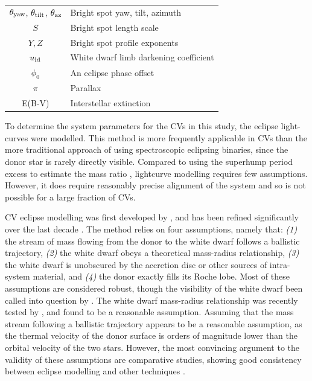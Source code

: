 \begin{table}
\begin{tabular}{cl}
        $\theta_{\rm yaw}$, $\theta_{\rm tilt}$, $\theta_{\rm az}$      & Bright spot yaw, tilt, azimuth                          \\
        $S$                                                             & Bright spot length scale                                \\
        $Y, Z$                                                          & Bright spot profile exponents                           \\
        $u_{\rm ld}$                                                    & White dwarf limb darkening coefficient                  \\
        $\phi_0$                                                        & An eclipse phase offset                                 \\
        $\pi$                                                           & Parallax                                                \\
        E(B-V)                                                          & Interstellar extinction   \\

        \hline
    \end{tabular}
\end{table}

To determine the system parameters for the CVs in this study, the eclipse light-curves were modelled. This method is more frequently applicable in CVs than the more traditional approach of using spectroscopic eclipsing binaries, since the donor star is rarely directly visible. Compared to using the superhump period excess to estimate the mass ratio \citep{patterson2005, knigge2006}, lightcurve modelling requires few assumptions. However, it does require reasonably precise alignment of the system and so is not possible for a large fraction of CVs.

CV eclipse modelling was first developed by \citet{wood1986}, and has been refined significantly over the last decade \citep{Savoury2011, littlefair2014, McAllister2017, McAllister2019}. The method relies on four assumptions, namely that: \textit{(1)} the stream of mass flowing from the donor to the white dwarf follows a ballistic trajectory, \textit{(2)} the white dwarf obeys a theoretical mass-radius relationship, \textit{(3)} the white dwarf is unobscured by the accretion disc or other sources of intra-system material, and \textit{(4)} the donor exactly fills its Roche lobe.
Most of these assumptions are considered robust, though the visibility of the white dwarf been called into question by \citet{Spark2015}.
The white dwarf mass-radius relationship was recently tested by \citet{parsons2017}, and found to be a reasonable assumption.
Assuming that the mass stream following a ballistic trajectory appears to be a reasonable assumption, as the thermal velocity of the donor surface is orders of magnitude lower than the orbital velocity of the two stars.
However, the most convincing argument to the validity of these assumptions are comparative studies, showing good consistency between eclipse modelling and other techniques \citep{tulloch2009,copperwheat2012,savoury2012,sion2022}.

